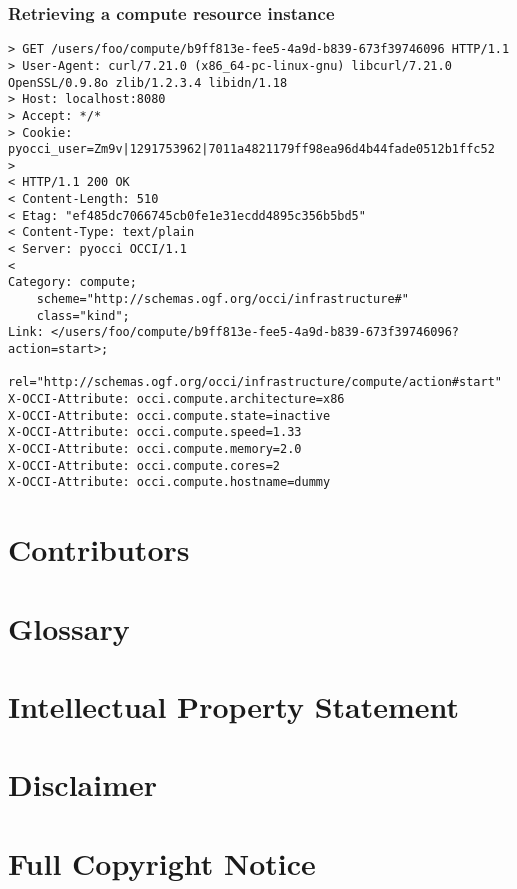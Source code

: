 \documentclass[10pt,a4paper]{article}
\begin{document}
\subsubsection{Retrieving a compute resource instance}
\begin{verbatim}
> GET /users/foo/compute/b9ff813e-fee5-4a9d-b839-673f39746096 HTTP/1.1
> User-Agent: curl/7.21.0 (x86_64-pc-linux-gnu) libcurl/7.21.0 OpenSSL/0.9.8o zlib/1.2.3.4 libidn/1.18
> Host: localhost:8080
> Accept: */*
> Cookie: pyocci_user=Zm9v|1291753962|7011a4821179ff98ea96d4b44fade0512b1ffc52
> 
< HTTP/1.1 200 OK
< Content-Length: 510
< Etag: "ef485dc7066745cb0fe1e31ecdd4895c356b5bd5"
< Content-Type: text/plain
< Server: pyocci OCCI/1.1
< 
Category: compute;
    scheme="http://schemas.ogf.org/occi/infrastructure#"
    class="kind";
Link: </users/foo/compute/b9ff813e-fee5-4a9d-b839-673f39746096?action=start>;
    rel="http://schemas.ogf.org/occi/infrastructure/compute/action#start"
X-OCCI-Attribute: occi.compute.architecture=x86
X-OCCI-Attribute: occi.compute.state=inactive
X-OCCI-Attribute: occi.compute.speed=1.33
X-OCCI-Attribute: occi.compute.memory=2.0
X-OCCI-Attribute: occi.compute.cores=2
X-OCCI-Attribute: occi.compute.hostname=dummy
\end{verbatim}

\section{Contributors}


\section{Glossary}
\label{sec:glossary}


\section{Intellectual Property Statement}


\section{Disclaimer}


\section{Full Copyright Notice}




\end{document}
